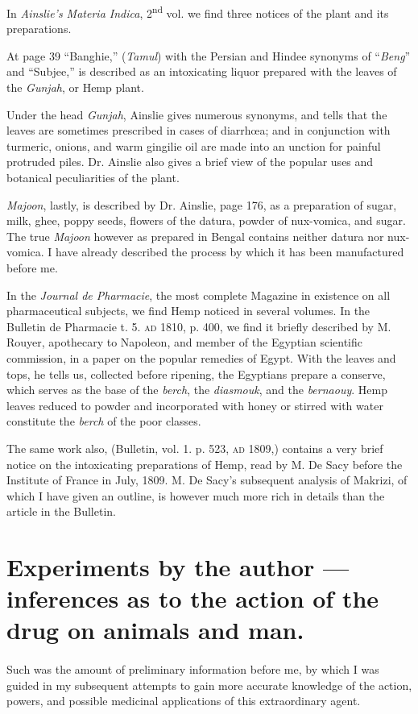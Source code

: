 \documentclass[a4paper, 11pt, oneside, polutonikogreek, english]{article}
\begin{document}
In \emph{Ainslie's Materia Indica}, 2\textsuperscript{nd} vol. we find three notices of the plant and its preparations.

At page 39 ``Banghie,'' (\emph{Tamul}) with the Persian and Hindee synonyms of ``\emph{Beng}'' and ``Subjee,'' is described as an intoxicating liquor prepared with the leaves of the \emph{Gunjah}, or Hemp plant.

Under the head \emph{Gunjah}, Ainslie gives numerous synonyms, and tells that the leaves are sometimes prescribed in cases of diarrhœa; and in conjunction with turmeric, onions, and warm gingilie oil are made into an unction for painful protruded piles. Dr. Ainslie also gives a brief view of the popular uses and botanical peculiarities of the plant.

\emph{Majoon}, lastly, is described by Dr. Ainslie, page 176, as a preparation of sugar, milk, ghee, poppy seeds, flowers of the datura, powder of nux-vomica, and sugar. The true \emph{Majoon} however as prepared in Bengal contains neither datura nor nux-vomica. I have already described the process by which it has been manufactured before me.

In the \emph{Journal de Pharmacie}, the most complete Magazine in existence on all pharmaceutical subjects, we find Hemp noticed in several volumes. In the Bulletin de Pharmacie t. 5. \textsc{ad} 1810, p. 400, we find it briefly described by M. Rouyer, apothecary to Napoleon, and member of the Egyptian scientific commission, in a paper on the popular remedies of Egypt. With the leaves and tops, he tells us, collected before ripening, the Egyptians prepare a conserve, which serves as the base of the \emph{berch}, the \emph{diasmouk}, and the \emph{bernaouy}. Hemp leaves reduced to powder and incorporated with honey or stirred with water constitute the \emph{berch} of the poor classes.

The same work also, (Bulletin, vol. 1. p. 523, \textsc{ad} 1809,) contains a very brief notice on the intoxicating preparations of Hemp, read by M. De Sacy before the Institute of France in July, 1809. M. De Sacy's subsequent analysis of Makrizi, of which I have given an outline, is however much more rich in details than the article in the Bulletin.
\clearpage
\section{Experiments by the author --- inferences as to the action of the drug on animals and man.}
\paragraph{}
Such was the amount of preliminary information before me, by which I was guided in my subsequent attempts to gain more accurate knowledge of the action, powers, and possible medicinal applications of this extraordinary agent.
\end{document}
